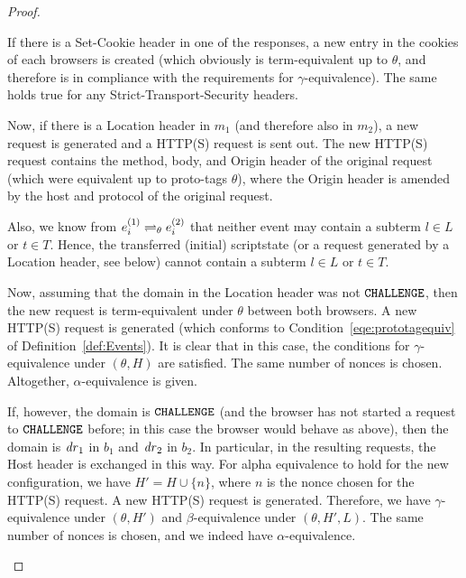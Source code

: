 \begin{proof}
\begin{description}
\begin{enumerate}[I.]
\begin{enumerate}
              If there is a Set-Cookie header in one of the responses, a new
              entry in the cookies of each browsers is created (which
              obviously is term-equivalent up to $\theta$, and therefore is
              in compliance with the requirements for $\gamma$-equivalence).
              The same holds true for any Strict-Transport-Security headers.
      
              Now, if there is a Location header in $m_1$ (and therefore
              also in $m_2$), a new request is generated and a HTTP(S) request is sent out. 
              The new HTTP(S) request contains the method, body, and Origin
              header of the original request (which were equivalent up to
              proto-tags $\theta$), where the Origin header is amended by
              the host and protocol of the original request.
      
              Also, we know from
              $e_i^{(1)} \rightleftharpoons_{\theta} e_i^{(2)}$ that neither
              event may contain a subterm $l\in L$ or $t \in T$. Hence, the
              transferred (initial) scriptstate (or a request generated by a
              Location header, see below) cannot contain a subterm $l \in L$
              or $t \in T$.
      
              Now, assuming that the domain in the Location header was not
              $\mathtt{CHALLENGE}$, then the new request is term-equivalent
              under $\theta$ between both browsers. A new HTTP(S) request is
              generated (which conforms to Condition~\ref{eqe:prototagequiv}
              of Definition~\ref{def:Events}). It is clear that in this case, the conditions for
              $\gamma$-equivalence under $(\theta, H)$ are satisfied. 
              The same number of nonces is chosen. Altogether, $\alpha$-equivalence is given.
      
              If, however, the domain is $\mathtt{CHALLENGE}$ (and the browser
              has not started a request to $\mathtt{CHALLENGE}$ before; in this
              case the browser would behave as above), then the domain is
              $\mathit{dr}_1$ in $b_1$ and $\mathit{dr}_2$ in $b_2$. In particular,
              in the resulting requests, the Host header is exchanged in
              this way. For alpha equivalence to hold for the new
              configuration, we have $H' = H \cup \{n\}$, where $n$ is the
              nonce chosen for the HTTP(S) request. A new HTTP(S) request is
              generated. Therefore, we have
              $\gamma$-equivalence under $(\theta, H')$ and
              $\beta$-equivalence under $(\theta, H', L)$. The same number
              of nonces is chosen, and we indeed have $\alpha$-equivalence.
      

\end{enumerate}
\end{enumerate}
\end{description}
\end{proof}
